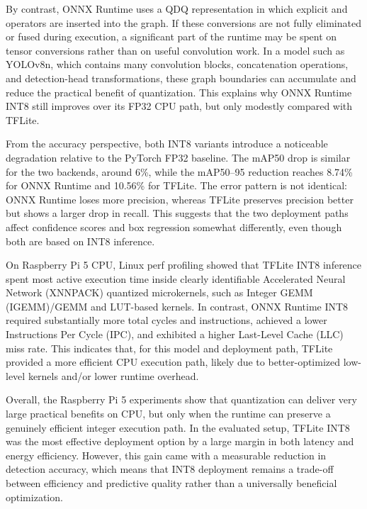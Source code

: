 \documentclass[12pt,a4paper]{report}
\begin{document}
By contrast, ONNX Runtime uses a QDQ representation in which explicit  and
 operators are inserted into the graph. If these conversions are not fully
eliminated or fused during execution, a significant part of the runtime may be spent on tensor
conversions rather than on useful convolution work. In a model such as YOLOv8n, which contains many
convolution blocks, concatenation operations, and detection-head transformations, these graph
boundaries can accumulate and reduce the practical benefit of quantization. This explains why ONNX
Runtime INT8 still improves over its FP32 CPU path, but only modestly compared with TFLite.

From the accuracy perspective, both INT8 variants introduce a noticeable degradation relative to the
PyTorch FP32 baseline. The mAP50 drop is similar for the two backends, around 6\%, while the
mAP50--95 reduction reaches 8.74\% for ONNX Runtime and 10.56\% for TFLite. The error pattern is not
identical: ONNX Runtime loses more precision, whereas TFLite preserves precision better but shows a
larger drop in recall. This suggests that the two deployment paths affect confidence scores and box
regression somewhat differently, even though both are based on INT8 inference.

On Raspberry Pi 5 CPU, Linux perf profiling showed that TFLite INT8 inference spent most active execution
time inside clearly identifiable Accelerated Neural Network (XNNPACK) quantized microkernels, such as Integer
GEMM (IGEMM)/GEMM and LUT-based kernels.
In contrast, ONNX Runtime INT8 required substantially more total cycles and instructions, achieved a lower
Instructions Per Cycle (IPC), and exhibited a higher Last-Level Cache (LLC) miss rate. This indicates that, for
this model and deployment path, TFLite
provided a more efficient CPU execution path, likely due to better-optimized low-level kernels and/or lower
runtime overhead.

Overall, the Raspberry Pi 5 experiments show that quantization can deliver very large practical
benefits on CPU, but only when the runtime can preserve a genuinely efficient integer execution path.
In the evaluated setup, TFLite INT8 was the most effective deployment option by a large margin in
both latency and energy efficiency. However, this gain came with a measurable reduction in detection
accuracy, which means that INT8 deployment remains a trade-off between efficiency and predictive
quality rather than a universally beneficial optimization.
\end{document}
